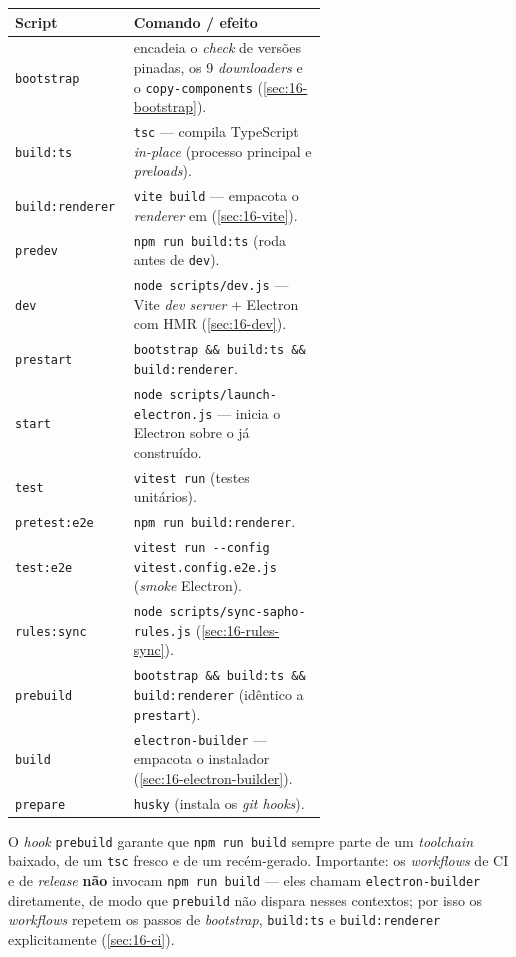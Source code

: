 \begin{longtable}{l P{0.62\linewidth}}
\toprule
\textbf{Script} & \textbf{Comando / efeito} \\
\midrule
\endhead
\texttt{bootstrap}      & encadeia o \emph{check} de versões pinadas, os 9 \emph{downloaders} e o \texttt{copy-components} (\autoref{sec:16-bootstrap}). \\
\texttt{build:ts}        & \lstinline|tsc| — compila TypeScript \emph{in-place} (processo principal e \emph{preloads}). \\
\texttt{build:renderer}  & \lstinline|vite build| — empacota o \emph{renderer} em  (\autoref{sec:16-vite}). \\
\texttt{predev}          & \lstinline|npm run build:ts| (roda antes de \texttt{dev}). \\
\texttt{dev}             & \lstinline|node scripts/dev.js| — Vite \emph{dev server} + Electron com HMR (\autoref{sec:16-dev}). \\
\texttt{prestart}        & \lstinline|bootstrap && build:ts && build:renderer|. \\
\texttt{start}           & \lstinline|node scripts/launch-electron.js| — inicia o Electron sobre o  já construído. \\
\texttt{test}            & \lstinline|vitest run| (testes unitários). \\
\texttt{pretest:e2e}     & \lstinline|npm run build:renderer|. \\
\texttt{test:e2e}        & \lstinline|vitest run --config vitest.config.e2e.js| (\emph{smoke} Electron). \\
\texttt{rules:sync}      & \lstinline|node scripts/sync-sapho-rules.js| (\autoref{sec:16-rules-sync}). \\
\texttt{prebuild}        & \lstinline|bootstrap && build:ts && build:renderer| (idêntico a \texttt{prestart}). \\
\texttt{build}           & \lstinline|electron-builder| — empacota o instalador (\autoref{sec:16-electron-builder}). \\
\texttt{prepare}         & \lstinline|husky| (instala os \emph{git hooks}). \\
\bottomrule
\end{longtable}

\begin{nota}
O \emph{hook} \texttt{prebuild} garante que \lstinline|npm run build| sempre
parte de um \emph{toolchain} baixado, de um \texttt{tsc} fresco e de um
 recém-gerado. Importante: os \emph{workflows} de CI e de
\emph{release} \textbf{não} invocam \lstinline|npm run build| --- eles chamam
\lstinline|electron-builder| diretamente, de modo que \texttt{prebuild} não
dispara nesses contextos; por isso os \emph{workflows} repetem os passos de
\emph{bootstrap}, \texttt{build:ts} e \texttt{build:renderer} explicitamente
(\autoref{sec:16-ci}).
\end{nota}

